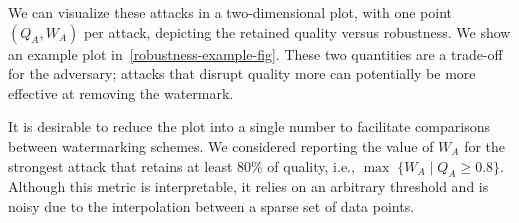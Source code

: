 
We can visualize these attacks in a two-dimensional plot,
with one point $(Q_A,W_A)$ per attack,
depicting the retained quality versus robustness.
%
We show an example plot in~\cref{robustness-example-fig}.
%
These two quantities are a trade-off for the adversary;
attacks that disrupt quality more can potentially be more
effective at removing the watermark.
%
%

%


%
It is desirable to reduce the plot into a single number to facilitate comparisons between watermarking schemes.
%
We considered reporting the value of $W_A$ for the strongest attack that retains at least 80\% of quality, i.e., $\max \; \{W_A \mid Q_A \ge 0.8\}$.
%
Although this metric is interpretable, it relies on an 
arbitrary threshold and is noisy due to the interpolation between a sparse set of data points.
%

